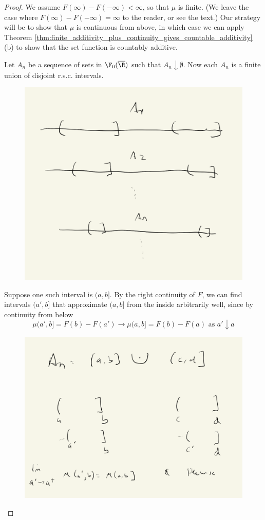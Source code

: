 \documentclass{article} %
\begin{document}
\begin{proof}
We assume $F(\infty) - F(-\infty) < \infty$, so that $\mu$ is finite.   (We leave the case where $F(\infty) - F(-\infty) = \infty$	to the reader, or see the text.)  Our strategy will be to show that $\mu$ is continuous from above, in which case we can apply Theorem \ref{thm:finite_additivity_plus_continuity_gives_countable_additivity} (b) to show that the set function is countably additive.

Let $A_n$ be a sequence of sets in $\F_0(\overline{\R})$ such that $A_n \downarrow \emptyset$.  Now each $A_n$ is a finite union of disjoint r.s.c. intervals.

\begin{figure}[H]
\centering
\includegraphics[width=.45\textwidth]{images/decreasing_sequence_of_union_of_rsc_intervals}	
\end{figure}

 Suppose one such interval is $(a,b]$.  By the right continuity of $F$, we can find intervals $(a',b]$ that approximate $(a,b]$ from the inside arbitrarily well, since by continuity from below
\[ \mu(a',b] = F(b) - F(a') \to \mu(a,b] = F(b) - F(a) \text{ as } a' \downarrow a \] 

\begin{figure}[H]
\centering
\includegraphics[width=.45\textwidth]{images/approximating_union_of_rsc_intervals}	
\end{figure}


\end{proof}
\end{document}
